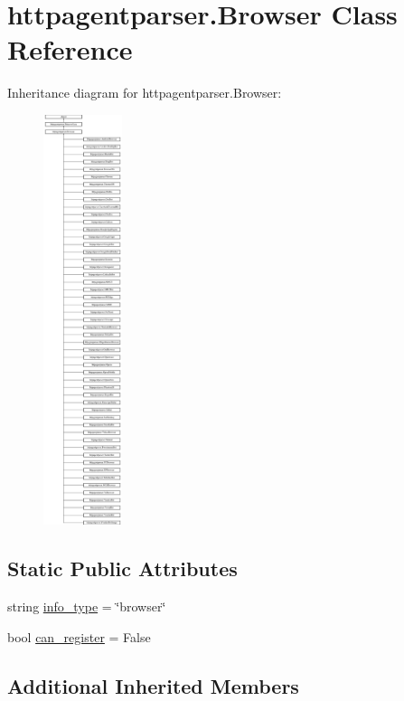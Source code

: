 \hypertarget{classhttpagentparser_1_1_browser}{}\section{httpagentparser.\+Browser Class Reference}
\label{classhttpagentparser_1_1_browser}
Inheritance diagram for httpagentparser.\+Browser\+:\begin{figure}[H]
\begin{center}
\leavevmode
\includegraphics[height=12.000000cm]{classhttpagentparser_1_1_browser}
\end{center}
\end{figure}
\subsection*{Static Public Attributes}
\begin{DoxyCompactItemize}
\item 
string \hyperlink{classhttpagentparser_1_1_browser_a1ed49119b85e7559bb054a217c6e6876}{info\+\_\+type} = \char`\"{}browser\char`\"{}
\item 
bool \hyperlink{classhttpagentparser_1_1_browser_a6d09a51067f73d88dd2af5997fd44e1a}{can\+\_\+register} = False
\end{DoxyCompactItemize}
\subsection*{Additional Inherited Members}


